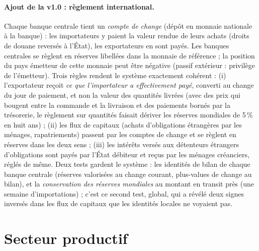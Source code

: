 \documentclass[11pt,a4paper]{article}
\begin{document}
\paragraph{Ajout de la v1.0 : règlement international.} Chaque banque centrale tient un \emph{compte de change} (dépôt en monnaie nationale à la banque) : les importateurs y paient la valeur rendue de leurs achats (droits de douane reversés à l'État), les exportateurs en sont payés. Les banques centrales se règlent en réserves libellées dans la monnaie de référence ; la position du pays émetteur de cette monnaie peut être négative (passif extérieur : privilège de l'émetteur). Trois règles rendent le système exactement cohérent : (i) l'exportateur reçoit \emph{ce que l'importateur a effectivement payé}, converti au change du jour de paiement, et non la valeur des quantités livrées (avec des prix qui bougent entre la commande et la livraison et des paiements bornés par la trésorerie, le règlement sur quantités faisait dériver les réserves mondiales de 5\,\% en huit ans) ; (ii) les flux de capitaux (achats d'obligations étrangères par les ménages, rapatriements) passent par les comptes de change et se règlent en réserves dans les deux sens ; (iii) les intérêts versés aux détenteurs étrangers d'obligations sont payés par l'État débiteur et reçus par les ménages créanciers, réglés de même. Deux tests gardent le système : les identités de bilan de chaque banque centrale (réserves valorisées au change courant, plus-values de change au bilan), et la \emph{conservation des réserves mondiales} au montant en transit près (une semaine d'importations) ; c'est ce second test, global, qui a révélé deux signes inversés dans les flux de capitaux que les identités locales ne voyaient pas.

\section{Secteur productif}
\label{sec:prod}
\end{document}
